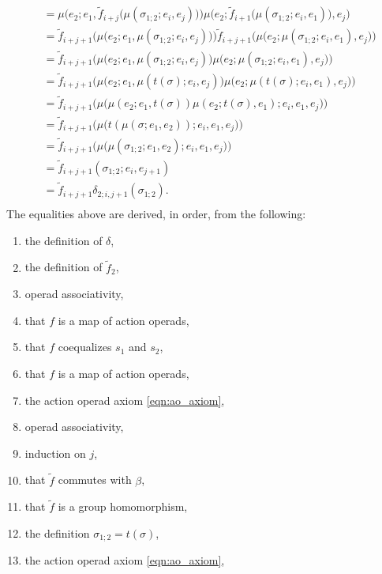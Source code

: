 \begin{example}
\begin{itemize}
\begin{align*}
& = \mu \Big(  e_2; e_1, \tilde{f}_{i+j}\big(\mu ( \sigma_{1;2}; e_i, e_j) \big) \Big) \mu \Big(  e_2; \tilde{f}_{i+1} \big(\mu (\sigma_{1;2}; e_i, e_1) \big), e_j \Big) \\
& = \tilde{f}_{i+j+1}\Big( \mu \big(  e_2; e_1, \mu ( \sigma_{1;2}; e_i, e_j) \big) \Big) \tilde{f}_{i+j+1}\Big(\mu \big(  e_2;  \mu (\sigma_{1;2}; e_i, e_1), e_j\big) \Big) \\
& = \tilde{f}_{i+j+1}\Big( \mu \big(  e_2; e_1, \mu ( \sigma_{1;2}; e_i, e_j) \big) \mu \big(  e_2;  \mu (\sigma_{1;2}; e_i, e_1), e_j\big) \Big)  \\
& = \tilde{f}_{i+j+1}\Big( \mu \big(  e_2; e_1, \mu ( t(\sigma); e_i, e_j) \big) \mu \big(  e_2;  \mu (t(\sigma); e_i, e_1), e_j\big) \Big)  \\
& = \tilde{f}_{i+j+1}\Big( \mu\big( \mu(e_2; e_1, t(\sigma))\mu(e_2; t(\sigma), e_1); e_i, e_1, e_j\big)\Big)  \\
& = \tilde{f}_{i+j+1}\Big( \mu\big( t(\mu(\sigma;e_1, e_2)); e_i, e_1, e_j\big)\Big)  \\
& = \tilde{f}_{i+j+1}\Big( \mu\big( \mu(\sigma_{1;2};e_1, e_2); e_i, e_1, e_j\big)\Big)  \\
& = \tilde{f}_{i+j+1}( \sigma_{1;2}; e_i, e_{j+1})  \\
& = \tilde{f}_{i+j+1}\delta_{2; i, j+1}(\sigma_{1;2}).  \\
\end{align*}
The equalities above are derived, in order, from the following:
\begin{enumerate}
\item the definition of $\delta$, 
\item the definition of $\tilde{f}_2$, 
\item operad associativity,
\item that $f$ is a map of action operads,
\item that $f$ coequalizes $s_1$ and $s_2$,
\item that $f$ is a map of action operads,
\item the action operad axiom \cref{eqn:ao_axiom},
\item operad associativity, 
\item induction on $j$,
\item that $\tilde{f}$ commutes with $\beta$,
\item that $\tilde{f}$ is a group homomorphism,
\item the definition $\sigma_{1;2} = t(\sigma)$,
\item the action operad axiom \cref{eqn:ao_axiom},

\end{enumerate}
\end{itemize}
\end{example}
